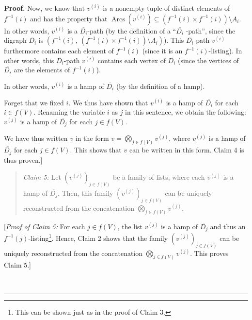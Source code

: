 \documentclass[numbers=enddot,12pt,final,onecolumn,notitlepage]{scrartcl}%
\numberwithin{exer}{section}
\theoremstyle{definition}
\newenvironment{statement}{\begin{quote}}{\end{quote}}
\newenvironment{proof}[1][Proof]{\noindent\textbf{#1.} }{\ \rule{0.5em}{0.5em}}
\newenvironment{verlong}{}{}
\begin{document}
\begin{verlong}
\begin{proof}
Now, we know that $v^{\left(  i\right)  }$ is a nonempty tuple of distinct
elements of $f^{-1}\left(  i\right)  $ and has the property that
$\operatorname*{Arcs}\left(  v^{\left(  i\right)  }\right)  \subseteq\left(
f^{-1}\left(  i\right)  \times f^{-1}\left(  i\right)  \right)  \setminus
A_{i}$. In other words, $v^{\left(  i\right)  }$ is a $\overline{D_{i}}$-path
(by the definition of a \textquotedblleft$\overline{D_{i}}$%
-path\textquotedblright, since the digraph $\overline{D_{i}}$ is $\left(
f^{-1}\left(  i\right)  ,\ \left(  f^{-1}\left(  i\right)  \times
f^{-1}\left(  i\right)  \right)  \setminus A_{i}\right)  $). This
$\overline{D_{i}}$-path $v^{\left(  i\right)  }$ furthermore contains each
element of $f^{-1}\left(  i\right)  $ (since it is an $f^{-1}\left(  i\right)
$-listing). In other words, this $\overline{D_{i}}$-path $v^{\left(  i\right)
}$ contains each vertex of $\overline{D_{i}}$ (since the vertices of
$\overline{D_{i}}$ are the elements of $f^{-1}\left(  i\right)  $).

In other words, $v^{\left(  i\right)  }$ is a hamp of $\overline{D_{i}}$ (by
the definition of a hamp).

Forget that we fixed $i$. We thus have shown that $v^{\left(  i\right)  }$ is
a hamp of $\overline{D_{i}}$ for each $i\in f\left(  V\right)  $. Renaming the
variable $i$ as $j$ in this sentence, we obtain the following: $v^{\left(
j\right)  }$ is a hamp of $\overline{D_{j}}$ for each $j\in f\left(  V\right)
$.

We have thus written $v$ in the form $v=\bigotimes\limits_{j\in f\left(
V\right)  }v^{\left(  j\right)  }$, where $v^{\left(  j\right)  }$ is a hamp
of $\overline{D_{j}}$ for each $j\in f\left(  V\right)  $. This shows that $v$
can be written in this form. Claim 4 is thus proven.]

\begin{statement}
\textit{Claim 5:} Let $\left(  v^{\left(  j\right)  }\right)  _{j\in f\left(
V\right)  }$ be a family of lists, where each $v^{\left(  j\right)  }$ is a
hamp of $\overline{D_{j}}$. Then, this family $\left(  v^{\left(  j\right)
}\right)  _{j\in f\left(  V\right)  }$ can be uniquely reconstructed from the
concatenation $\bigotimes\limits_{j\in f\left(  V\right)  }v^{\left(
j\right)  }$.
\end{statement}

[\textit{Proof of Claim 5:} For each $j\in f\left(  V\right)  $, the list
$v^{\left(  j\right)  }$ is a hamp of $\overline{D_{j}}$ and thus an
$f^{-1}\left(  j\right)  $-listing\footnote{This can be shown just as in the
proof of Claim 3.}. Hence, Claim 2 shows that the family $\left(  v^{\left(
j\right)  }\right)  _{j\in f\left(  V\right)  }$ can be uniquely reconstructed
from the concatenation $\bigotimes\limits_{j\in f\left(  V\right)  }v^{\left(
j\right)  }$. This proves Claim 5.]


\end{proof}
\end{verlong}
\end{document}
